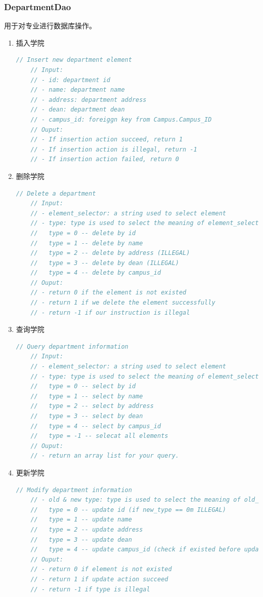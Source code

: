 \documentclass[../report.tex]{subfiles}
\begin{document}
\subsubsection{DepartmentDao}
用于对专业进行数据库操作。
\begin{enumerate}
\itemsep 0em
\item 插入学院\\
\begin{lstlisting}[language=java,backgroundcolor=\color{lightgray}]
    // Insert new department element
    // Input:
    // - id: department id
    // - name: department name
    // - address: department address
    // - dean: department dean
    // - campus_id: foreiggn key from Campus.Campus_ID
    // Ouput:
    // - If insertion action succeed, return 1
    // - If insertion action is illegal, return -1
    // - If insertion action failed, return 0
\end{lstlisting}
\item 删除学院\\
\begin{lstlisting}[language=java,backgroundcolor=\color{lightgray}]
    // Delete a department
    // Input:
    // - element_selector: a string used to select element
    // - type: type is used to select the meaning of element_selector
    //   type = 0 -- delete by id
    //   type = 1 -- delete by name
    //   type = 2 -- delete by address (ILLEGAL)
    //   type = 3 -- delete by dean (ILLEGAL)
    //   type = 4 -- delete by campus_id
    // Ouput:
    // - return 0 if the element is not existed
    // - return 1 if we delete the element successfully
    // - return -1 if our instruction is illegal
\end{lstlisting}
\item 查询学院\\
\begin{lstlisting}[language=java,backgroundcolor=\color{lightgray}]
    // Query department information
    // Input:
    // - element_selector: a string used to select element
    // - type: type is used to select the meaning of element_selector
    //   type = 0 -- select by id
    //   type = 1 -- select by name
    //   type = 2 -- select by address
    //   type = 3 -- select by dean
    //   type = 4 -- select by campus_id
    //   type = -1 -- selecat all elements
    // Ouput:
    // - return an array list for your query.
\end{lstlisting}
\item 更新学院\\
\begin{lstlisting}[language=java,backgroundcolor=\color{lightgray}]
    // Modify department information
    // - old & new type: type is used to select the meaning of old_value & new_value
    //   type = 0 -- update id (if new_type == 0m ILLEGAL)
    //   type = 1 -- update name
    //   type = 2 -- update address
    //   type = 3 -- update dean
    //   type = 4 -- update campus_id (check if existed before update)
    // Ouput:
    // - return 0 if element is not existed
    // - return 1 if update action succeed
    // - return -1 if type is illegal
\end{lstlisting}
\end{enumerate}
\end{document}
